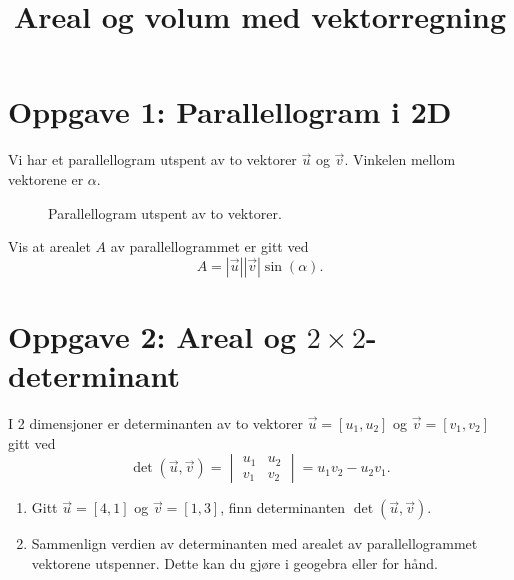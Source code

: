 \documentclass[a4paper,12pt]{article}
\title{Areal og volum med vektorregning}
\date{}
\begin{document}
\maketitle

\section*{Oppgave 1: Parallellogram i 2D}
Vi har et parallellogram utspent av to vektorer $\vec{u}$ og $\vec{v}$. Vinkelen mellom vektorene er $\alpha$.

\begin{figure}[h]
\begin{center}
\caption{Parallellogram utspent av to vektorer.}
\end{center}
\end{figure}

Vis at arealet $A$ av parallellogrammet er gitt ved 
\begin{equation}
	A = |\vec{u}| |\vec{v}| \sin(\alpha).
\end{equation}


\section*{\boldmath Oppgave 2: Areal og $2\times2$-determinant}

I 2 dimensjoner er determinanten av to vektorer $\vec{u} = [u_1, u_2]$ og $\vec{v} = [v_1, v_2]$ gitt ved \[ \det(\vec{u}, \vec{v}) = \begin{vmatrix} u_1 & u_2 \\ v_1 & v_2 \end{vmatrix} = u_1v_2 - u_2v_1. \]

\begin{enumerate}
    \item[a)] Gitt $\vec{u} = [4, 1]$ og $\vec{v} = [1, 3]$, finn determinanten $\det(\vec u, \vec v)$.
    \item[b)] Sammenlign verdien av determinanten med arealet av parallellogrammet vektorene utspenner. Dette kan du gjøre i geogebra eller for hånd.
\end{enumerate}
\end{document}
